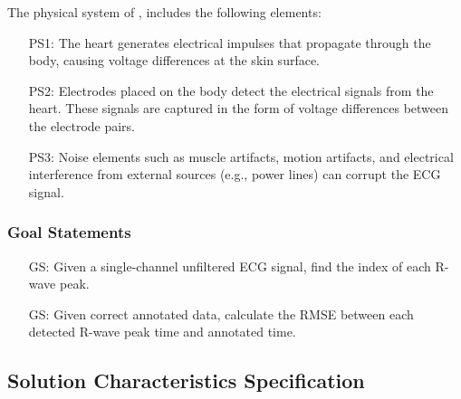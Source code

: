 \documentclass[12pt]{article}
\begin{document}
The physical system of \progname{}, includes the following elements:

\begin{itemize}

\item[PS1:] The heart generates electrical impulses that propagate through the
body, causing voltage differences at the skin surface.

\item[PS2:] Electrodes placed on the body detect the electrical signals from the
heart.  These signals are captured in the form of voltage differences between
the electrode pairs.

\item[PS3:] Noise elements such as muscle artifacts, motion artifacts, and
electrical interference from external sources (e.g., power lines) can corrupt
the ECG signal.

\end{itemize}


\subsubsection{Goal Statements}

\begin{itemize}

\item[GS\refstepcounter{goalnum}\thegoalnum \label{G_find_index}:] Given a
single-channel unfiltered ECG signal, find the index of each R-wave peak.

\item[GS\refstepcounter{goalnum}\thegoalnum \label{G_calculate_RMSE}:] Given
correct annotated data, calculate the RMSE between each detected R-wave peak
time and annotated time.

\end{itemize}

\subsection{Solution Characteristics Specification}

\end{document}

